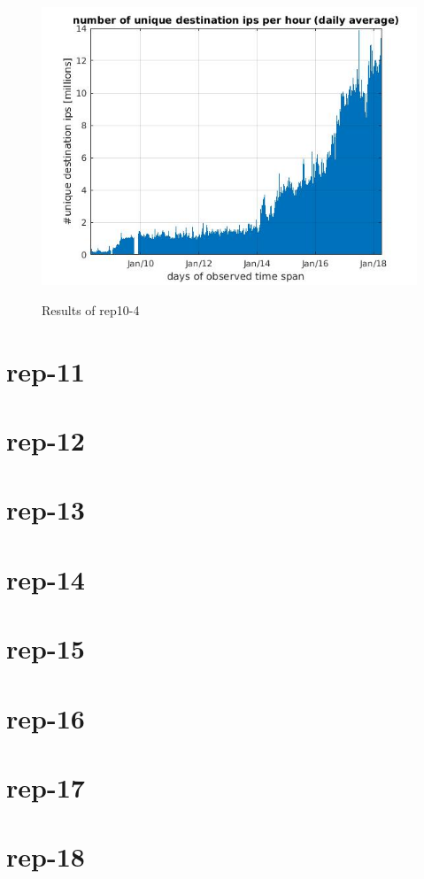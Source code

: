 \begin{figure}[H]
\center
\includegraphics[width=.7\textwidth]{./chapters/plots/rep10_4.jpg}\\
\caption{Results of rep10-4}
\end{figure}

\section*{rep-11}

\section*{rep-12}

\section*{rep-13}

\section*{rep-14}

\section*{rep-15}

\section*{rep-16}

\section*{rep-17}

\section*{rep-18}

